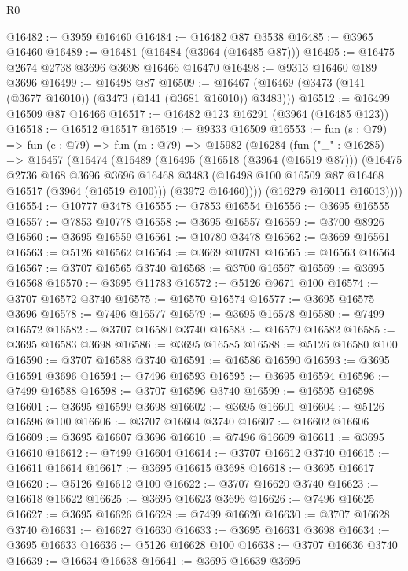 \begin{lexlean}{R0}
\begin{coremodule}
@16482 := @3959 @16460
@16484 := @16482 @87 @3538
@16485 := @3965 @16460
@16489 := @16481 (@16484 (@3964 (@16485 @87)))
@16495 := @16475 @2674 @2738 @3696 @3698 @16466 @16470
@16498 := @9313 @16460 @189 @3696
@16499 := @16498 @87
@16509 := @16467 (@16469 (@3473 (@141 (@3677 @16010)) (@3473 (@141 (@3681 @16010)) @3483)))
@16512 := @16499 @16509 @87 @16466
@16517 := @16482 @123 @16291 (@3964 (@16485 @123))
@16518 := @16512 @16517
@16519 := @9333 @16509
@16553 := fun (s : @79) =>
  fun (e : @79) =>
  fun (m : @79) =>
  @15982
    (@16284
      (fun ("_" : @16285) =>
      @16457
        (@16474
          (@16489
            (@16495
              (@16518 (@3964 (@16519 @87)))
              (@16475
                @2736
                @168
                @3696
                @3696
                @16468
                @3483
                (@16498 @100 @16509 @87 @16468 @16517 (@3964 (@16519 @100)))
                (@3972 @16460))))
          (@16279 @16011 @16013))))
@16554 := @10777 @3478
@16555 := @7853 @16554
@16556 := @3695 @16555
@16557 := @7853 @10778
@16558 := @3695 @16557
@16559 := @3700 @8926
@16560 := @3695 @16559
@16561 := @10780 @3478
@16562 := @3669 @16561
@16563 := @5126 @16562
@16564 := @3669 @10781
@16565 := @16563 @16564
@16567 := @3707 @16565 @3740
@16568 := @3700 @16567
@16569 := @3695 @16568
@16570 := @3695 @11783
@16572 := @5126 @9671 @100
@16574 := @3707 @16572 @3740
@16575 := @16570 @16574
@16577 := @3695 @16575 @3696
@16578 := @7496 @16577
@16579 := @3695 @16578
@16580 := @7499 @16572
@16582 := @3707 @16580 @3740
@16583 := @16579 @16582
@16585 := @3695 @16583 @3698
@16586 := @3695 @16585
@16588 := @5126 @16580 @100
@16590 := @3707 @16588 @3740
@16591 := @16586 @16590
@16593 := @3695 @16591 @3696
@16594 := @7496 @16593
@16595 := @3695 @16594
@16596 := @7499 @16588
@16598 := @3707 @16596 @3740
@16599 := @16595 @16598
@16601 := @3695 @16599 @3698
@16602 := @3695 @16601
@16604 := @5126 @16596 @100
@16606 := @3707 @16604 @3740
@16607 := @16602 @16606
@16609 := @3695 @16607 @3696
@16610 := @7496 @16609
@16611 := @3695 @16610
@16612 := @7499 @16604
@16614 := @3707 @16612 @3740
@16615 := @16611 @16614
@16617 := @3695 @16615 @3698
@16618 := @3695 @16617
@16620 := @5126 @16612 @100
@16622 := @3707 @16620 @3740
@16623 := @16618 @16622
@16625 := @3695 @16623 @3696
@16626 := @7496 @16625
@16627 := @3695 @16626
@16628 := @7499 @16620
@16630 := @3707 @16628 @3740
@16631 := @16627 @16630
@16633 := @3695 @16631 @3698
@16634 := @3695 @16633
@16636 := @5126 @16628 @100
@16638 := @3707 @16636 @3740
@16639 := @16634 @16638
@16641 := @3695 @16639 @3696

\end{coremodule}
\end{lexlean}
